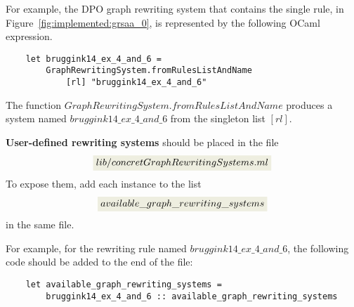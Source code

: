 For example, the DPO graph rewriting system that contains the single rule, in Figure~\ref{fig:implemented:grsaa_0}, is represented by the following OCaml expression. 
\begin{verbatim}
    let bruggink14_ex_4_and_6 =
        GraphRewritingSystem.fromRulesListAndName 
            [rl] "bruggink14_ex_4_and_6"
\end{verbatim}
The function \colorbox{Ivory2}{$GraphRewritingSystem.fromRulesListAndName$} produces a system named \colorbox{Ivory2}{$bruggink14\_ex\_4\_and\_6$} from the singleton list \colorbox{Ivory2}{$[rl]$}.


\textbf{User-defined rewriting systems} should be placed in the file 
    $$\colorbox{Ivory2}{$lib/concretGraphRewritingSystems.ml$}$$
 To expose them, add each instance to the list 
 $$\colorbox{Ivory2}{$available\_graph\_rewriting\_systems$}$$ in the same file.

For example, for the rewriting rule named \colorbox{Ivory2}{$bruggink14\_ex\_4\_and\_6$}, the following code should be added to the end of the file:
\begin{verbatim}
    let available_graph_rewriting_systems = 
        bruggink14_ex_4_and_6 :: available_graph_rewriting_systems 
\end{verbatim}

